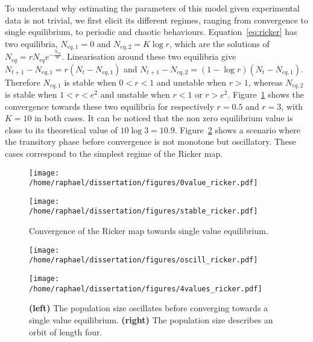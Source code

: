 \documentclass[12pt]{article}
\begin{document}
	To understand why estimating the parameters of this model given experimental data is not trivial, we first elicit its different regimes, ranging from convergence to single equilibrium, to periodic and  chaotic behaviours. Equation~\ref{eq:ricker} has two equilibria, $N_{eq, 1} = 0$ and $N_{eq, 2} = K\log r$, which are the solutions of  $N_{eq} = r N_{eq} e^{-\frac{N_{eq}}{K}}$. Linearisation around these two equilibria give $N_{t+1} - N_{eq, 1} = r(N_{t} - N_{eq, 1})$ and $N_{t+1} - N_{eq, 2} = (1-\log r)(N_{t} - N_{eq, 1})$. Therefore $N_{eq, 1}$ is stable when $0 < r < 1$ and unstable when $r > 1$, whereas $N_{eq, 2}$ is stable when $1 < r < e^2$ and unstable when $r < 1$ or $r > e^2$. Figure~\ref{fig:stab} shows the convergence towards these two equilibria for respectively $r=0.5$ and $r=3$, with $K=10$ in both cases. It can be noticed that the non zero equilibrium value is close to its theoretical value of $10 \log 3 = 10.9$.  Figure~\ref{fig:oscill} shows a scenario where the transitory phase before convergence is not monotone but oscillatory. These cases correspond to the simplest regime of the Ricker map.

	\begin{figure}[htb]
		\centering
		\vspace{5mm}
		\begin{minipage}{0.49\textwidth}
			\centering
			\texttt{[image: /home/raphael/dissertation/figures/0value\_ricker.pdf]}
		\end{minipage}
		\begin{minipage}{0.49\textwidth}
			\centering
			\texttt{[image: /home/raphael/dissertation/figures/stable\_ricker.pdf]}
		\end{minipage}
		\caption{Convergence of the Ricker map towards single value equilibrium.}
		\vspace{5mm}
		\label{fig:stab}
	\end{figure}
	
	\begin{figure}[htb]
		\centering
		\vspace{5mm}
		\begin{minipage}{0.49\textwidth}
			\centering
			\texttt{[image: /home/raphael/dissertation/figures/oscill\_ricker.pdf]}
		\end{minipage}
		\begin{minipage}{0.49\textwidth}
			\centering
			\texttt{[image: /home/raphael/dissertation/figures/4values\_ricker.pdf]}
		\end{minipage}
		\caption[Examples of oscillation and orbit of the Ricker map.]{\textbf{(left)} The population size oscillates before converging towards a single value equilibrium. \textbf{(right)} The population size describes an orbit of length four.}
		\vspace{5mm}
		\label{fig:oscill}
	\end{figure}
	
\end{document}
